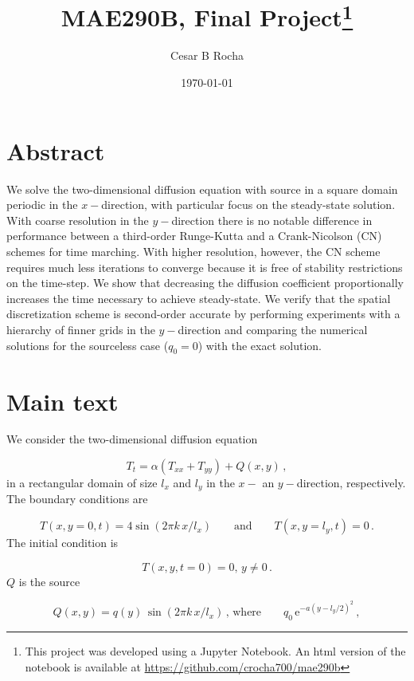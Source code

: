 \documentclass[11pt]{article}
\title{MAE290B, Final Project\footnote{This project was developed using a Jupyter Notebook. An html version of the notebook is available at \href{https://github.com/crocha700/mae290b}{https://github.com/crocha700/mae290b}}}
\author{Cesar B Rocha}
\date{\today}
\newcommand{\ee}{\mathrm{e}}
\newcommand{\com}{\, ,}
\newcommand{\per}{\, .}
\def\beq{\begin{equation}}
\def\eeq{\end{equation}}
\begin{document}
\maketitle

\section*{Abstract}

We solve the two-dimensional diffusion equation with source in a square domain periodic in the $x-$direction, with particular focus on the steady-state solution. With coarse resolution in the $y-$direction there is no notable difference in performance between a third-order Runge-Kutta  and a Crank-Nicolson (CN) schemes for time marching. With higher resolution, however, the CN scheme requires much less iterations to converge because it is free of stability restrictions on the time-step. We show that decreasing the diffusion coefficient proportionally increases the time necessary to achieve steady-state. We verify that the spatial discretization scheme is second-order accurate by performing experiments with a hierarchy of finner grids in the $y-$direction and comparing the numerical solutions for the sourceless case ($q_0=0$) with the exact solution.

\section*{Main text}

\noindent We consider the two-dimensional diffusion equation 

\beq
\label{exact_eqn}
T_t = \alpha\left(T_{xx}+T_{yy}\right) + Q(x,y)\com
\eeq
in a rectangular domain of size $l_x$ and $l_y$ in the $x-$ an $y-$direction, respectively. The boundary conditions are


\beq
\label{bc_eqn}
T(x,y=0,t) = 4\sin\left(2\pi k\,x/l_x\right)\qquad \text{and}\qquad T(x,y=l_y,t) = 0\per
\eeq
The initial condition is

\beq
\label{ic_eqn}
T(x,y,t=0) = 0, \,y\neq0\per
\eeq
$Q$ is the source

\beq
\label{ic_eqn}
Q(x,y) = q(y)\,\sin\left(2\pi k\,x/l_x\right)\,,\, \text{where}\qquad q_0\,\ee^{-a(y-l_y/2)^2}\com
\eeq
\end{document}
